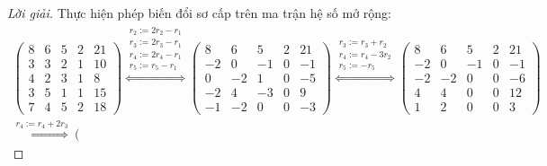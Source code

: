 \documentclass[class=nhvh-linear-algebra,crop=false]{standalone}
\begin{document}
\begin{proof}[Lời giải]
    \par Thực hiện phép biến đổi sơ cấp trên ma trận hệ số mở rộng:
    \begingroup{}
    \allowdisplaybreaks{}
    \begin{gather*}
        \left(
        \begin{array}{cccc|c}
                8 & 6 & 5 & 2 & 21 \\
                3 & 3 & 2 & 1 & 10 \\
                4 & 2 & 3 & 1 & 8  \\
                3 & 5 & 1 & 1 & 15 \\
                7 & 4 & 5 & 2 & 18
            \end{array}
        \right)
        \stackrel{
            \substack{
                r_{2}:= 2r_{2} {-} r_{1} \\
                r_{3}:= 2r_{3} {-} r_{1} \\
                r_{4}:= 2r_{4} {-} r_{1} \\
                r_{5}:= r_{5} {-} r_{1}
            }
        }{\Longleftrightarrow}
        \left(\begin{array}{cccc|c}
                8  & 6  & 5  & 2 & 21 \\
                -2 & 0  & -1 & 0 & -1 \\
                0  & -2 & 1  & 0 & -5 \\
                -2 & 4  & -3 & 0 & 9  \\
                -1 & -2 & 0  & 0 & -3
            \end{array}
        \right)
        \stackrel{
        \substack{
        r_{3}:= r_{3} + r_{2} \\
        r_{4}:= r_{4} {-} 3r_{2} \\
        r_{5}:= -r_{5}
        }
        }{\Longleftrightarrow}
        \left(\begin{array}{cccc|c}
                8  & 6  & 5  & 2 & 21 \\
                -2 & 0  & -1 & 0 & -1 \\
                -2 & -2 & 0  & 0 & -6 \\
                4  & 4  & 0  & 0 & 12 \\
                1  & 2  & 0  & 0 & 3
            \end{array}
        \right) \\
        \stackrel{
            r_{4}:= r_{4} + 2r_{3}
        }{\Longleftrightarrow}
        \left(\begin{array}{cccc|c}

\end{array}
\end{gather*}
\end{proof}
\end{document}
